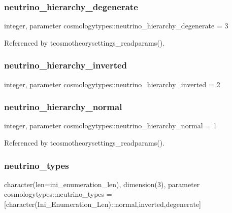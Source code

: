 \subsubsection{\texorpdfstring{neutrino\+\_\+hierarchy\+\_\+degenerate}{neutrino\_hierarchy\_degenerate}}
{\footnotesize\ttfamily integer, parameter cosmologytypes\+::neutrino\+\_\+hierarchy\+\_\+degenerate = 3}



Referenced by tcosmotheorysettings\+\_\+readparams().

\mbox{\label{namespacecosmologytypes_a61a310ab75549fa17f2c5dbd9ec7e638}} 
\subsubsection{\texorpdfstring{neutrino\+\_\+hierarchy\+\_\+inverted}{neutrino\_hierarchy\_inverted}}
{\footnotesize\ttfamily integer, parameter cosmologytypes\+::neutrino\+\_\+hierarchy\+\_\+inverted = 2}

\mbox{\label{namespacecosmologytypes_ac77eac54651ec04a99342a063e413398}} 
\subsubsection{\texorpdfstring{neutrino\+\_\+hierarchy\+\_\+normal}{neutrino\_hierarchy\_normal}}
{\footnotesize\ttfamily integer, parameter cosmologytypes\+::neutrino\+\_\+hierarchy\+\_\+normal = 1}



Referenced by tcosmotheorysettings\+\_\+readparams().

\mbox{\label{namespacecosmologytypes_a6c895faee0146a00099a99e8caa7b0b1}} 
\subsubsection{\texorpdfstring{neutrino\+\_\+types}{neutrino\_types}}
{\footnotesize\ttfamily character(len=ini\+\_\+enumeration\+\_\+len), dimension(3), parameter cosmologytypes\+::neutrino\+\_\+types = \mbox{[}character(Ini\+\_\+\+Enumeration\+\_\+\+Len)\+::\textquotesingle{}normal\textquotesingle{},\textquotesingle{}inverted\textquotesingle{},\textquotesingle{}degenerate\textquotesingle{}\mbox{]}}



